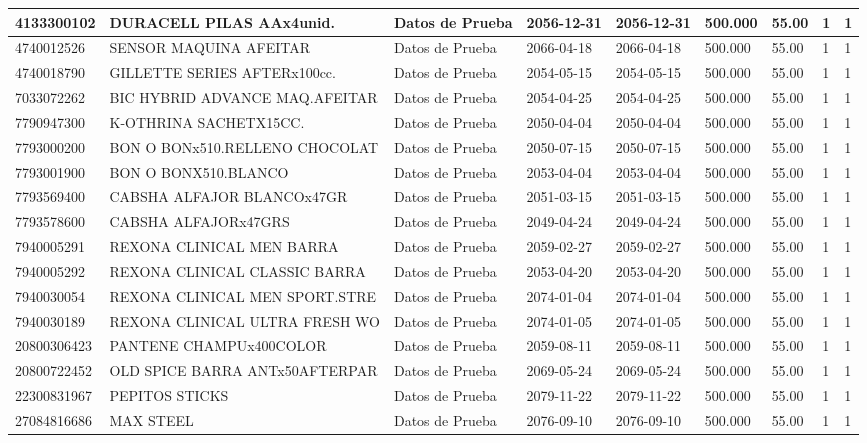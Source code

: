 \documentclass[a4paper,12pt]{article}
\begin{document}
\begin{landscape}
\begin{longtable}{|p{4cm}|p{2.5cm}|p{2.5cm}|p{1.8cm}|p{1.8cm}|p{1cm}|p{1cm}|p{3cm}|p{3cm}||}
4133300102 & DURACELL PILAS AAx4unid. & Datos de Prueba & 2056-12-31 & 2056-12-31 & 500.000 & 55.00 & 1 & 1 \\ \hline 
4740012526 & SENSOR MAQUINA AFEITAR & Datos de Prueba & 2066-04-18 & 2066-04-18 & 500.000 & 55.00 & 1 & 1 \\ \hline 
4740018790 & GILLETTE SERIES AFTERx100cc. & Datos de Prueba & 2054-05-15 & 2054-05-15 & 500.000 & 55.00 & 1 & 1 \\ \hline 
7033072262 & BIC HYBRID ADVANCE MAQ.AFEITAR & Datos de Prueba & 2054-04-25 & 2054-04-25 & 500.000 & 55.00 & 1 & 1 \\ \hline 
7790947300 & K-OTHRINA SACHETX15CC. & Datos de Prueba & 2050-04-04 & 2050-04-04 & 500.000 & 55.00 & 1 & 1 \\ \hline 
7793000200 & BON O BONx510.RELLENO CHOCOLAT & Datos de Prueba & 2050-07-15 & 2050-07-15 & 500.000 & 55.00 & 1 & 1 \\ \hline 
7793001900 & BON O BONX510.BLANCO & Datos de Prueba & 2053-04-04 & 2053-04-04 & 500.000 & 55.00 & 1 & 1 \\ \hline 
7793569400 & CABSHA ALFAJOR BLANCOx47GR & Datos de Prueba & 2051-03-15 & 2051-03-15 & 500.000 & 55.00 & 1 & 1 \\ \hline 
7793578600 & CABSHA ALFAJORx47GRS & Datos de Prueba & 2049-04-24 & 2049-04-24 & 500.000 & 55.00 & 1 & 1 \\ \hline 
7940005291 & REXONA CLINICAL MEN BARRA & Datos de Prueba & 2059-02-27 & 2059-02-27 & 500.000 & 55.00 & 1 & 1 \\ \hline 
7940005292 & REXONA CLINICAL CLASSIC BARRA & Datos de Prueba & 2053-04-20 & 2053-04-20 & 500.000 & 55.00 & 1 & 1 \\ \hline 
7940030054 & REXONA CLINICAL MEN SPORT.STRE & Datos de Prueba & 2074-01-04 & 2074-01-04 & 500.000 & 55.00 & 1 & 1 \\ \hline 
7940030189 & REXONA CLINICAL ULTRA FRESH WO & Datos de Prueba & 2074-01-05 & 2074-01-05 & 500.000 & 55.00 & 1 & 1 \\ \hline 
20800306423 & PANTENE CHAMPUx400COLOR & Datos de Prueba & 2059-08-11 & 2059-08-11 & 500.000 & 55.00 & 1 & 1 \\ \hline 
20800722452 & OLD SPICE BARRA ANTx50AFTERPAR & Datos de Prueba & 2069-05-24 & 2069-05-24 & 500.000 & 55.00 & 1 & 1 \\ \hline 
22300831967 & PEPITOS STICKS & Datos de Prueba & 2079-11-22 & 2079-11-22 & 500.000 & 55.00 & 1 & 1 \\ \hline 
27084816686 & MAX STEEL & Datos de Prueba & 2076-09-10 & 2076-09-10 & 500.000 & 55.00 & 1 & 1 \\ \hline 

\end{longtable}
\end{landscape}
\end{document}
